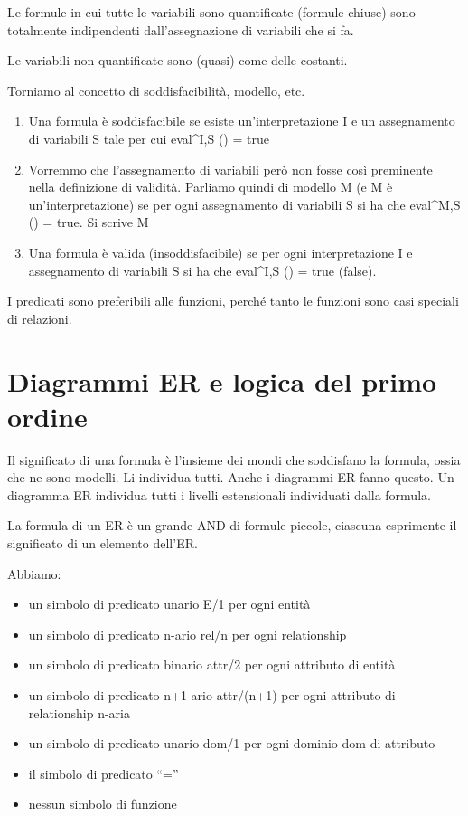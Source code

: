 \begin{oss}
Le formule in cui tutte le variabili sono quantificate (formule chiuse) sono totalmente indipendenti dall'assegnazione di variabili che si fa.

Le variabili non quantificate sono (quasi) come delle costanti.
\end{oss}

Torniamo al concetto di soddisfacibilit\`a, modello, etc.

\begin{enumerate}
    \item Una formula \`e soddisfacibile se esiste un'interpretazione I e un assegnamento di variabili S tale per cui eval^{I,S} (\phi) = true
    \item Vorremmo che l'assegnamento di variabili per\`o non fosse cos\`i preminente nella definizione di validit\`a. Parliamo quindi di modello M (e M \`e un'interpretazione) se per ogni assegnamento di variabili S si ha che eval^{M,S} (\phi) = true. Si scrive M \models \phi
    \item Una formula \`e valida (insoddisfacibile) se per ogni interpretazione I e assegnamento di variabili S si ha che eval^{I,S} (\phi) = true (false).
\end{enumerate}

I predicati sono preferibili alle funzioni, perch\'e tanto le funzioni sono casi speciali di relazioni.

\section{Diagrammi ER e logica del primo ordine}

Il significato di una formula \`e l'insieme dei mondi che soddisfano la formula, ossia che ne sono modelli. Li individua tutti. Anche i diagrammi ER fanno questo. Un diagramma ER individua tutti i livelli estensionali individuati dalla formula.

La formula di un ER \`e un grande AND di formule piccole, ciascuna esprimente il significato di un elemento dell'ER.

Abbiamo:
\begin{itemize}
    \item un simbolo di predicato unario E/1 per ogni entit\`a
    \item un simbolo di predicato n-ario rel/n per ogni relationship
    \item un simbolo di predicato binario attr/2 per ogni attributo di entit\`a
    \item un simbolo di predicato n+1-ario attr/(n+1) per ogni attributo di relationship n-aria
    \item un simbolo di predicato unario dom/1 per ogni dominio dom di attributo
    \item il simbolo di predicato ``=''
    \item nessun simbolo di funzione
\end{itemize}

